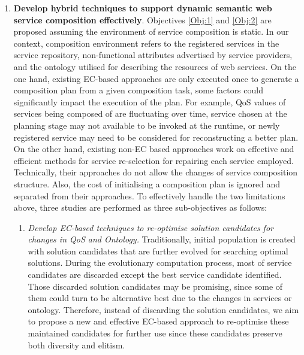 \begin{enumerate}
\begin{enumerate}
   \end{enumerate}
  
 \item \textbf{Develop hybrid techniques to support dynamic semantic web service composition effectively}. Objectives \ref{Obj:1} and \ref{Obj:2} are proposed assuming the environment of service composition is static. In our context, composition environment refers to the registered services in the service repository, non-functional attributes advertised by service providers, and the ontology utilised for describing the resources of web services. On the one hand, existing EC-based approaches are only executed once to generate a composition plan from a given composition task, some factors could significantly impact the execution of the plan. For example, QoS values of services being composed of are fluctuating over time, service chosen at the planning stage may not available to be invoked at the runtime, or newly registered service may need to be considered for reconstructing a better plan. On the other hand, existing non-EC based approaches \cite{nasridinov2012qos,salas2006ws,wagner2016robust,yin2010qos} work on effective and efficient methods for service re-selection for repairing each service employed. Technically, their approaches do not allow the changes of service composition structure. Also, the cost of initialising a composition plan is ignored and separated from their approaches. To effectively handle the two limitations above, three studies are performed as three sub-objectives as follows:

  \begin{enumerate}
 \item \label{Obj:3.1} \emph{Develop EC-based techniques to re-optimise solution candidates for changes in QoS and Ontology.} Traditionally, initial population is created with solution candidates that are further evolved for searching optimal solutions. During the evolutionary computation process, most of service candidates are discarded except the best service candidate identified. Those discarded solution candidates may be promising, since some of them could turn to be alternative best due to the changes in services or ontology. Therefore, instead of discarding the solution candidates, we aim to propose a new and effective EC-based approach to re-optimise these maintained candidates for further use since these candidates preserve both diversity and elitism. 


\end{enumerate}
\end{enumerate}
